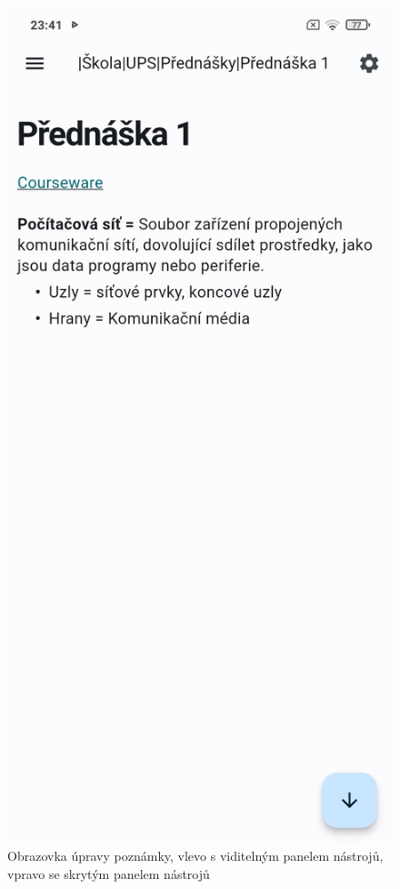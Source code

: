 \documentclass[czech, bc, kiv, he, iso690numb]{fasthesis}
\begin{document}
\begin{figure}[h!]
\begin{minipage}[h]{0.45\textwidth}
  \end{minipage}
  \hspace{10pt}
  \begin{minipage}[h]{0.45\textwidth}
    \includegraphics[width=\textwidth]{img/BP-Runt/UserManual/HiddenRichTextEditor.jpg}
  \end{minipage}
  \caption{Obrazovka úpravy poznámky, vlevo s viditelným panelem nástrojů, vpravo se skrytým panelem nástrojů}
  \label{fig:editationOfNote}
\end{figure}
\end{document}
